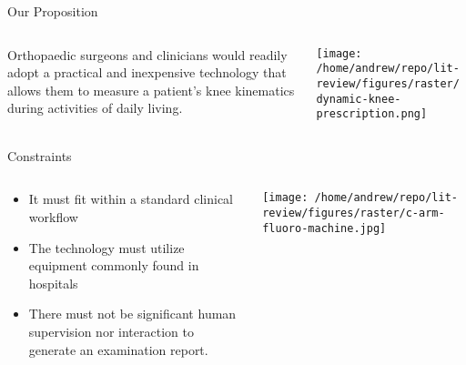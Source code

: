 \documentclass[presentation, aspectratio=1610]{beamer}
\begin{document}
\begin{frame}[label={sec:orge11abe5}]{Our Proposition}
\begin{columns}
\begin{column}{0.5\columnwidth}
Orthopaedic surgeons and clinicians would readily adopt a \alert{\alert{practical}} and \alert{\alert{inexpensive}} technology that allows them to \alert{\alert{measure}} a patient's knee kinematics during \alert{\alert{activities of daily living}}.
\end{column}
\begin{column}{0.55\columnwidth}
\begin{center}
\texttt{[image: /home/andrew/repo/lit-review/figures/raster/dynamic-knee-prescription.png]}
\end{center}
\end{column}
\end{columns}
\end{frame}
\begin{frame}[label={sec:org81ac375}]{Constraints}
\begin{columns}
\begin{column}{0.45\columnwidth}
\begin{itemize}
\item It must fit within a \alert{\alert{standard clinical workflow}}
\item The technology must utilize equipment \alert{\alert{commonly found in hospitals}}
\item There must not be significant \alert{\alert{human supervision}} nor interaction to generate an examination report.
\end{itemize}
\end{column}
\begin{column}{0.55\columnwidth}
\begin{center}
\texttt{[image: /home/andrew/repo/lit-review/figures/raster/c-arm-fluoro-machine.jpg]}
\end{center}
\end{column}
\end{columns}
\end{frame}
\end{document}
